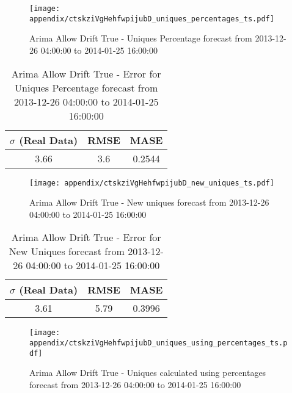 \begin{figure}[H] \begin{center} \leavevmode
\texttt{[image: appendix/ctskziVgHehfwpijubD\_uniques\_percentages\_ts.pdf]} \caption[]{
Arima Allow Drift True - Uniques Percentage forecast from 2013-12-26 04:00:00 to 2014-01-25 16:00:00} \label{fig:appendix/ctskziVgHehfwpijubD_uniques_percentages_ts.pdf} \end{center}
\end{figure}

\begin{table}[H]
\centering
\footnotesize
\begin{tabular}{ccc}
$\sigma$ (Real Data) & RMSE & MASE   \\ \hline
3.66 & 3.6 & 0.2544 \\
\end{tabular}

\vspace{0.5cm}

\caption[]{
Arima Allow Drift True - Error for Uniques Percentage forecast from 2013-12-26 04:00:00 to 2014-01-25 16:00:00}
\end{table}

\begin{figure}[H] \begin{center} \leavevmode
\texttt{[image: appendix/ctskziVgHehfwpijubD\_new\_uniques\_ts.pdf]} \caption[]{
Arima Allow Drift True - New uniques forecast from 2013-12-26 04:00:00 to 2014-01-25 16:00:00} \label{fig:appendix/ctskziVgHehfwpijubD_new_uniques_ts.pdf} \end{center}
\end{figure}

\begin{table}[H]
\centering
\footnotesize
\begin{tabular}{ccc}
$\sigma$ (Real Data) & RMSE & MASE   \\ \hline
3.61 & 5.79 & 0.3996 \\
\end{tabular}

\vspace{0.5cm}

\caption[]{
Arima Allow Drift True - Error for New Uniques forecast from 2013-12-26 04:00:00 to 2014-01-25 16:00:00}
\end{table}

\begin{figure}[H] \begin{center} \leavevmode
\texttt{[image: appendix/ctskziVgHehfwpijubD\_uniques\_using\_percentages\_ts.pdf]} \caption[]{
Arima Allow Drift True - Uniques calculated using percentages forecast from 2013-12-26 04:00:00 to 2014-01-25 16:00:00} \label{fig:appendix/ctskziVgHehfwpijubD_uniques_using_percentages_ts.pdf} \end{center}
\end{figure}

